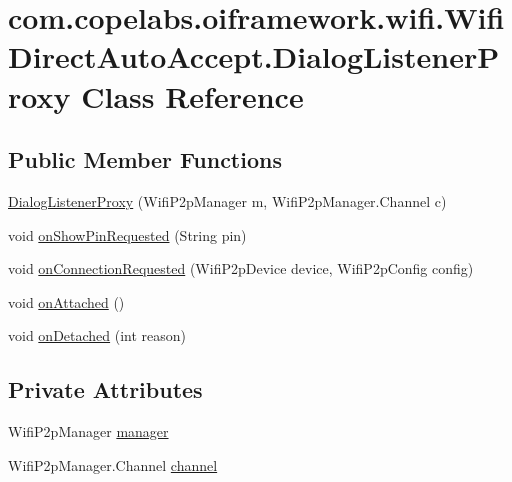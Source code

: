 \hypertarget{classcom_1_1copelabs_1_1oiframework_1_1wifi_1_1_wifi_direct_auto_accept_1_1_dialog_listener_proxy}{}\section{com.\+copelabs.\+oiframework.\+wifi.\+Wifi\+Direct\+Auto\+Accept.\+Dialog\+Listener\+Proxy Class Reference}
\label{classcom_1_1copelabs_1_1oiframework_1_1wifi_1_1_wifi_direct_auto_accept_1_1_dialog_listener_proxy}
\subsection*{Public Member Functions}
\begin{DoxyCompactItemize}
\item 
\hyperlink{classcom_1_1copelabs_1_1oiframework_1_1wifi_1_1_wifi_direct_auto_accept_1_1_dialog_listener_proxy_acb1c690bb50dcb09378ed5ef1e92b398}{Dialog\+Listener\+Proxy} (Wifi\+P2p\+Manager m, Wifi\+P2p\+Manager.\+Channel c)
\item 
void \hyperlink{classcom_1_1copelabs_1_1oiframework_1_1wifi_1_1_wifi_direct_auto_accept_1_1_dialog_listener_proxy_a74c2395b38406c3e2f34f1bf6229f01f}{on\+Show\+Pin\+Requested} (String pin)
\item 
void \hyperlink{classcom_1_1copelabs_1_1oiframework_1_1wifi_1_1_wifi_direct_auto_accept_1_1_dialog_listener_proxy_a381f06d40ec6743861c9eefede205932}{on\+Connection\+Requested} (Wifi\+P2p\+Device device, Wifi\+P2p\+Config config)
\item 
void \hyperlink{classcom_1_1copelabs_1_1oiframework_1_1wifi_1_1_wifi_direct_auto_accept_1_1_dialog_listener_proxy_a63785dd52a7d840ffe572c0547432765}{on\+Attached} ()
\item 
void \hyperlink{classcom_1_1copelabs_1_1oiframework_1_1wifi_1_1_wifi_direct_auto_accept_1_1_dialog_listener_proxy_a22c5a8951693293e498302a23235b7bb}{on\+Detached} (int reason)
\end{DoxyCompactItemize}
\subsection*{Private Attributes}
\begin{DoxyCompactItemize}
\item 
Wifi\+P2p\+Manager \hyperlink{classcom_1_1copelabs_1_1oiframework_1_1wifi_1_1_wifi_direct_auto_accept_1_1_dialog_listener_proxy_a70f3dc9b27585593ce80db3ebcdec5a7}{manager}
\item 
Wifi\+P2p\+Manager.\+Channel \hyperlink{classcom_1_1copelabs_1_1oiframework_1_1wifi_1_1_wifi_direct_auto_accept_1_1_dialog_listener_proxy_a20e98b87930dd1bba828a59ec1b3376b}{channel}
\end{DoxyCompactItemize}


